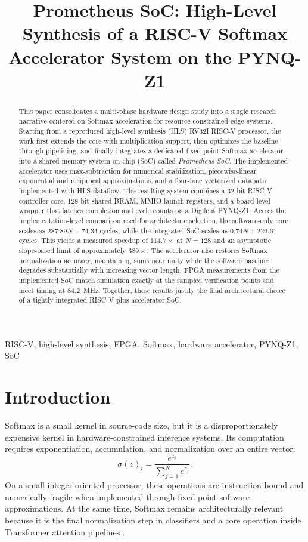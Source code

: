 \documentclass[conference]{IEEEtran}
\title{Prometheus SoC: High-Level Synthesis of a RISC-V Softmax Accelerator System on the PYNQ-Z1}
\author{
\IEEEauthorblockN{Jesse Levine}
\IEEEauthorblockA{
Department of Electronics\\
Carleton University\\
Ottawa, Canada
}
}
\begin{document}
\maketitle

\begin{abstract}
This paper consolidates a multi-phase hardware design study into a single research narrative centered on Softmax acceleration for resource-constrained edge systems. Starting from a reproduced high-level synthesis (HLS) RV32I RISC-V processor, the work first extends the core with multiplication support, then optimizes the baseline through pipelining, and finally integrates a dedicated fixed-point Softmax accelerator into a shared-memory system-on-chip (SoC) called \emph{Prometheus SoC}. The implemented accelerator uses max-subtraction for numerical stabilization, piecewise-linear exponential and reciprocal approximations, and a four-lane vectorized datapath implemented with HLS dataflow. The resulting system combines a 32-bit RISC-V controller core, 128-bit shared BRAM, MMIO launch registers, and a board-level wrapper that latches completion and cycle counts on a Digilent PYNQ-Z1. Across the implementation-level comparison used for architecture selection, the software-only core scales as $287.89N + 74.34$ cycles, while the integrated SoC scales as $0.74N + 226.61$ cycles. This yields a measured speedup of $114.7\times$ at $N=128$ and an asymptotic slope-based limit of approximately $389\times$. The accelerator also restores Softmax normalization accuracy, maintaining sums near unity while the software baseline degrades substantially with increasing vector length. FPGA measurements from the implemented SoC match simulation exactly at the sampled verification points and meet timing at \SI{84.2}{\mega\hertz}. Together, these results justify the final architectural choice of a tightly integrated RISC-V plus accelerator SoC.
\end{abstract}

\begin{IEEEkeywords}
RISC-V, high-level synthesis, FPGA, Softmax, hardware accelerator, PYNQ-Z1, SoC
\end{IEEEkeywords}

\section{Introduction}
Softmax is a small kernel in source-code size, but it is a disproportionately expensive kernel in hardware-constrained inference systems. Its computation requires exponentiation, accumulation, and normalization over an entire vector:
\begin{equation}
\sigma(z)_i = \frac{e^{z_i}}{\sum_{j=1}^{N} e^{z_j}}.
\end{equation}
On a small integer-oriented processor, these operations are instruction-bound and numerically fragile when implemented through fixed-point software approximations. At the same time, Softmax remains architecturally relevant because it is the final normalization step in classifiers and a core operation inside Transformer attention pipelines \cite{vaswani2017attention}.
\end{document}
